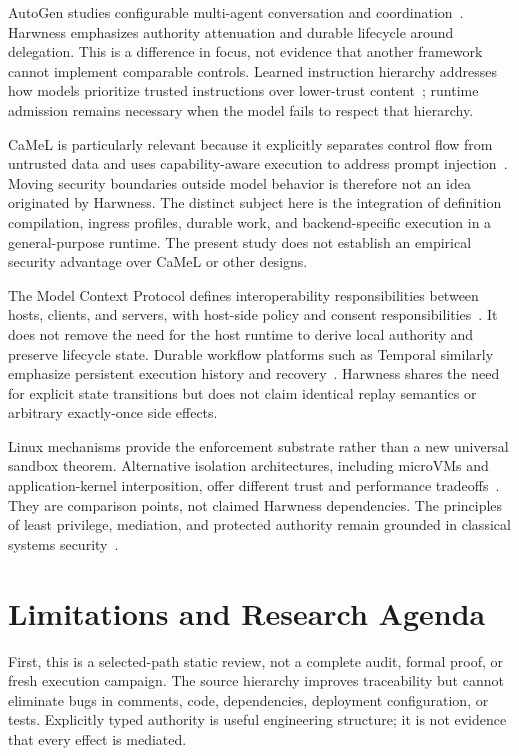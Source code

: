 AutoGen studies configurable multi-agent conversation and coordination~\cite{ref8}. Harwness emphasizes authority attenuation and durable lifecycle around delegation. This is a difference in focus, not evidence that another framework cannot implement comparable controls. Learned instruction hierarchy addresses how models prioritize trusted instructions over lower-trust content~\cite{ref52}; runtime admission remains necessary when the model fails to respect that hierarchy.

CaMeL is particularly relevant because it explicitly separates control flow from untrusted data and uses capability-aware execution to address prompt injection~\cite{ref53}. Moving security boundaries outside model behavior is therefore not an idea originated by Harwness. The distinct subject here is the integration of definition compilation, ingress profiles, durable work, and backend-specific execution in a general-purpose runtime. The present study does not establish an empirical security advantage over CaMeL or other designs.

The Model Context Protocol defines interoperability responsibilities between hosts, clients, and servers, with host-side policy and consent responsibilities~\cite{ref54}. It does not remove the need for the host runtime to derive local authority and preserve lifecycle state. Durable workflow platforms such as Temporal similarly emphasize persistent execution history and recovery~\cite{ref55}. Harwness shares the need for explicit state transitions but does not claim identical replay semantics or arbitrary exactly-once side effects.

Linux mechanisms provide the enforcement substrate rather than a new universal sandbox theorem. Alternative isolation architectures, including microVMs and application-kernel interposition, offer different trust and performance tradeoffs~\cite{ref56,ref57}. They are comparison points, not claimed Harwness dependencies. The principles of least privilege, mediation, and protected authority remain grounded in classical systems security~\cite{ref12}.

\section{Limitations and Research Agenda}
\label{sec:limitations}

First, this is a selected-path static review, not a complete audit, formal proof, or fresh execution campaign. The source hierarchy improves traceability but cannot eliminate bugs in comments, code, dependencies, deployment configuration, or tests. Explicitly typed authority is useful engineering structure; it is not evidence that every effect is mediated.

